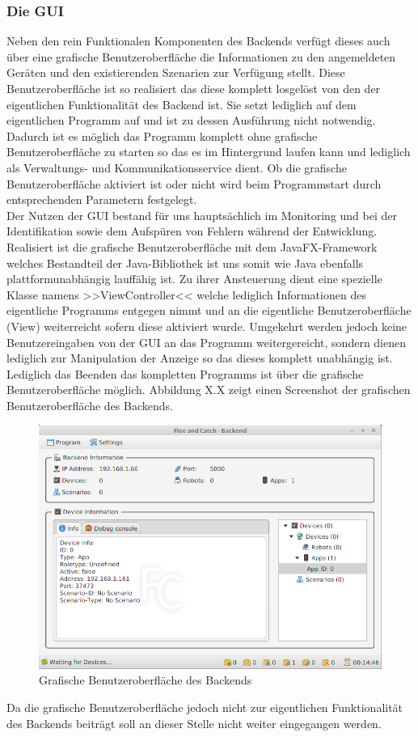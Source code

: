 \subsubsection{Die GUI}
Neben den rein Funktionalen Komponenten des Backends verfügt dieses auch über eine grafische Benutzeroberfläche die Informationen zu
den angemeldeten Geräten und den existierenden Szenarien zur Verfügung stellt. Diese Benutzeroberfläche ist so realisiert das diese 
komplett losgelöst von den der eigentlichen Funktionalität des Backend ist. Sie setzt lediglich auf dem eigentlichen Programm auf und
ist zu dessen Ausführung nicht notwendig. Dadurch ist es möglich das Programm komplett ohne grafische Benutzeroberfläche zu starten so
das es im Hintergrund laufen kann und lediglich als Verwaltungs- und Kommunikationsservice dient. Ob die grafische Benutzeroberfläche  
aktiviert ist oder nicht wird beim Programmstart durch entsprechenden Parametern festgelegt. \\
Der Nutzen der GUI bestand für uns hauptsächlich im Monitoring und bei der Identifikation sowie dem Aufspüren von Fehlern während der 
Entwicklung. \\
Realisiert ist die grafische Benutzeroberfläche mit dem JavaFX-Framework welches Bestandteil der Java-Bibliothek ist uns somit wie 
Java ebenfalls plattformunabhängig lauffähig ist. Zu ihrer Ansteuerung dient eine spezielle Klasse namens
>>ViewController<< welche lediglich Informationen des eigentliche Programms entgegen nimmt und an die eigentliche Benutzeroberfläche 
(View) weiterreicht sofern diese aktiviert wurde. Umgekehrt werden jedoch keine Benutzereingaben von der GUI an das Programm 
weitergereicht, sondern dienen lediglich zur Manipulation der Anzeige so das dieses komplett unabhängig ist. Lediglich das Beenden 
das kompletten Programms ist über die grafische Benutzeroberfläche möglich.
Abbildung X.X zeigt einen Screenshot der grafischen Benutzeroberfläche des Backends.
\begin{figure}[ht]
	\centering
	\includegraphics[width=1.0\textwidth]{images/implementation/BackendGUI.png}
	\caption[Grafische Benutzeroberfläche des Backends]{Grafische Benutzeroberfläche des Backends}
\end{figure}
\newline
Da die grafische Benutzeroberfläche jedoch nicht zur eigentlichen Funktionalität des Backends beiträgt soll an dieser Stelle nicht 
weiter eingegangen werden.
\newpage
